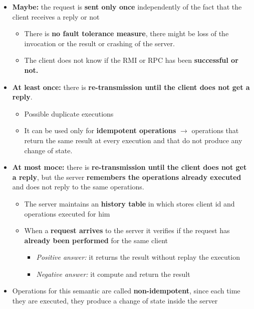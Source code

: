 \begin{itemize}
    \item \textbf{Maybe:} the request is \textbf{sent only once} independently of the fact that the client receives a reply or not
        \begin{itemize}
            \item There is \textbf{no fault tolerance measure}, there might be loss of the invocation or the result or crashing of the server.
            \item The client does not know if the RMI or RPC has been \textbf{successful or not.}
        \end{itemize}
    \item \textbf{At least once:} there is \textbf{re-transmission until the client does not get a reply}.
        \begin{itemize}
            \item Possible duplicate executions
            \item It can be used only for \textbf{idempotent operations} \(\rightarrow\) operations that return the same result at every execution and that do not produce any change of state.
        \end{itemize}
    \item \textbf{At most moce:} there is \textbf{re-transmission until the client does not get a reply}, but the server \textbf{remembers the operations already executed} and does not reply to the same operations.
        \begin{itemize}
            \item The server maintains an \textbf{history table} in which stores client id and operations executed for him
            \item When a \textbf{request arrives} to the server it verifies if the request has \textbf{already been performed} for the same client
                \begin{itemize}
                    \item \textit{Positive answer:} it returns the result without replay the execution
                    \item \textit{Negative answer:} it compute and return the result
                \end{itemize}
        \end{itemize}
    \item Operations for this semantic are called \textbf{non-idempotent}, since each time they are executed, they produce a change of state inside the server
\end{itemize}

